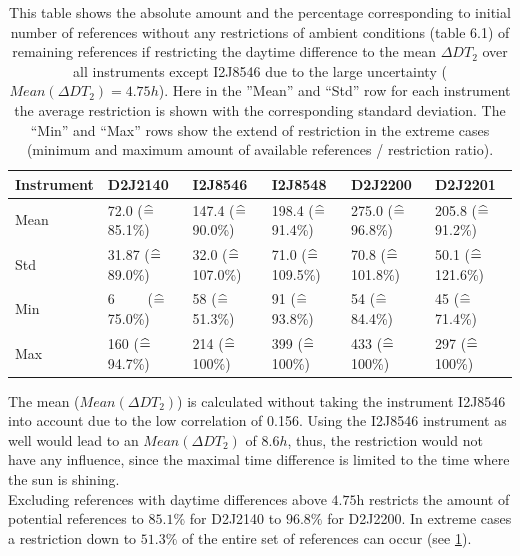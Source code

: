 \begin{table}
	\centering
	\begin{tabular}{p{1.8cm}|p{2.15cm}|p{2.15cm}|p{2.15cm}|p{2.15cm}|p{2.15cm}}
		Instrument	&D2J2140&I2J8546& I2J8548&D2J2200&D2J2201\\
		\toprule
		Mean&
		72.0 ($\mathrel{\widehat{=}}\,$85.1\%) &		147.4 ($\mathrel{\widehat{=}}\,$90.0\%)&
		198.4 ($\mathrel{\widehat{=}}\,$91.4\%)&		275.0 ($\mathrel{\widehat{=}}\,$96.8\%)&
		205.8 ($\mathrel{\widehat{=}}\,$91.2\%)\\
		\midrule
		Std&		31.87 ($\mathrel{\widehat{=}}\,$89.0\%)&32.0 ($\mathrel{\widehat{=}}\,$107.0\%)&
		71.0 ($\mathrel{\widehat{=}}\,$109.5\%)&		70.8 ($\mathrel{\widehat{=}}\,$101.8\%)&
		50.1 ($\mathrel{\widehat{=}}\,$121.6\%) \\
		\midrule
		Min&
		6 $\qquad$($\mathrel{\widehat{=}}\,$75.0\%)&		58 ($\mathrel{\widehat{=}}\,$51.3\%)
		&91 ($\mathrel{\widehat{=}}\,$93.8\%)		&54 ($\mathrel{\widehat{=}}\,$84.4\%)
		&45 ($\mathrel{\widehat{=}}\,$71.4\%)\\
		\midrule
		Max&
		160 ($\mathrel{\widehat{=}}\,$94.7\%) &
		214 ($\mathrel{\widehat{=}}\,$100\%) &
		399 ($\mathrel{\widehat{=}}\,$100\%) &
		433 ($\mathrel{\widehat{=}}\,$100\%) &
		297 ($\mathrel{\widehat{=}}\,$100\%) \\
		\bottomrule
	\end{tabular}
	\caption{This table shows the absolute amount and the percentage corresponding to initial number of references without any restrictions of ambient conditions (table 6.1) of remaining references if restricting the daytime difference to the mean $\Delta DT_{2}$ over all instruments except I2J8546 due to the large uncertainty ($Mean(\Delta DT_{2}) = 4.75h$). Here in the ”Mean” and “Std” row for each  instrument the average restriction is shown with the corresponding standard deviation. The “Min” and “Max” rows show the extend of restriction in the extreme cases (minimum and maximum amount of available references / restriction ratio).}
	\label{tab:daytimerest}
\end{table}	
The mean ($Mean(\Delta DT_{2})$) is calculated without taking the instrument I2J8546 into account due to the low correlation of 0.156. Using the I2J8546 instrument as well would lead to an  $Mean(\Delta DT_{2})$ of $8.6h$, thus, the restriction would not have any influence, since the maximal time difference is limited to the time where the sun is shining.\\ 
Excluding references with daytime differences above $4.75$h restricts the amount of potential references to $85.1\%$ for D2J2140 to $96.8\%$ for D2J2200. In extreme cases a restriction down to $51.3\%$ of the entire set of references can occur (see \cref{tab:daytimerest}).



